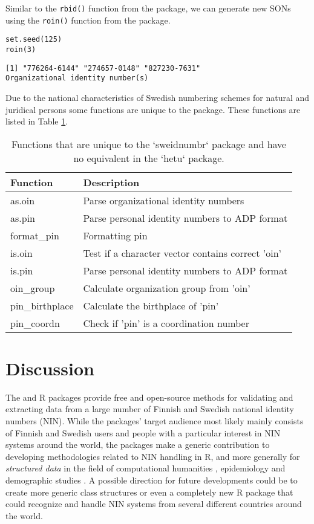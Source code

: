 Similar to the \texttt{rbid()} function from the  package, we can generate new SONs using the \texttt{roin()} function from the  package.

\begin{verbatim}
set.seed(125)
roin(3)
\end{verbatim}

\begin{verbatim}
[1] "776264-6144" "274657-0148" "827230-7631"
Organizational identity number(s)
\end{verbatim}

Due to the national characteristics of Swedish numbering schemes for natural and juridical persons some functions are unique to the  package. These functions are listed in Table \ref{tab:swe-function-table}.

\begin{table}[!h]
\centering
\caption{\label{tab:swe-function-table}Functions that are unique to the `sweidnumbr` package and have no equivalent in the `hetu` package.}
\centering
\begin{tabular}[t]{ll}
\toprule
Function & Description\\
\midrule
as.oin & Parse organizational identity numbers\\
as.pin & Parse personal identity numbers to ADP format\\
format\_pin & Formatting pin\\
is.oin & Test if a character vector contains correct 'oin'\\
is.pin & Parse personal identity numbers to ADP format\\
\addlinespace
oin\_group & Calculate organization group from 'oin'\\
pin\_birthplace & Calculate the birthplace of 'pin'\\
pin\_coordn & Check if 'pin' is a coordination number\\
\bottomrule
\end{tabular}
\end{table}

\section{Discussion}\label{discussion}

The  and  R packages provide free and open-source methods for validating and extracting data from a large number of Finnish and Swedish national identity numbers (NIN). While the packages' target audience most likely mainly consists of Finnish and Swedish users and people with a particular interest in NIN systems around the world, the packages make a generic contribution to developing methodologies related to NIN handling in R, and more generally for \emph{structured data} in the field of computational humanities \citep[see][]{makela2020}, epidemiology and demographic studies \citep[see][]{gissler2004}. A possible direction for future developments could be to create more generic class structures or even a completely new R package that could recognize and handle NIN systems from several different countries around the world.

